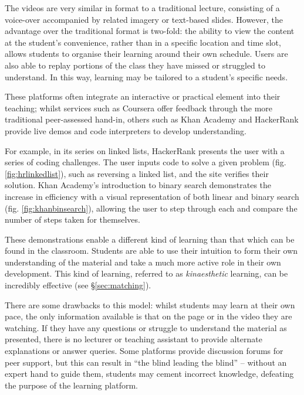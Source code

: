 \documentclass[bsc,twoside,singlespacing,parskip,logo,notimes,normalheadings]{infthesis}
\begin{document}
    The videos are very similar in format to a traditional lecture,
    consisting of a voice-over accompanied by related imagery or
    text-based slides. However, the advantage over the traditional
    format is two-fold: the ability to view the content at the
    student's convenience, rather than in a specific location and time
    slot, allows students to organise their learning around their own
    schedule. Users are also able to replay portions of the class they
    have missed or struggled to understand. In this way, learning may
    be tailored to a student's specific needs.

    These platforms often integrate an interactive or practical
    element into their teaching; whilst services such as Coursera
    offer feedback through the more traditional peer-assessed
    hand-in\cite{aboutcoursera}, others such as Khan Academy and
    HackerRank provide live demos and code interpreters to develop
    understanding.

    For example, in its series on linked lists\cite{hrlinkedlist},
    HackerRank presents the user with a series of coding
    challenges. The user inputs code to solve a given problem
    (fig. \ref{fig:hrlinkedlist}), such as reversing a linked list,
    and the site verifies their solution. Khan Academy's introduction
    to binary search\cite{khanbinsearch} demonstrates the increase in
    efficiency with a visual representation of both linear and binary
    search (fig. \ref{fig:khanbinsearch}), allowing the user to step
    through each and compare the number of steps taken for themselves.

    These demonstrations enable a different kind of learning than that
    which can be found in the classroom. Students are able to use
    their intuition to form their own understanding of the material
    and take a much more active role in their own development. This
    kind of learning, referred to as {\em kinaesthetic} learning, can
    be incredibly effective (see \S\ref{sec:matching}).

    There are some drawbacks to this model: whilst students may learn
    at their own pace, the only information available is that on the
    page or in the video they are watching. If they have any questions
    or struggle to understand the material as presented, there is no
    lecturer or teaching assistant to provide alternate explanations
    or answer queries. Some platforms provide discussion forums for
    peer support, but this can result in ``the blind leading the
    blind'' -- without an expert hand to guide them, students may
    cement incorrect knowledge, defeating the purpose of the learning
    platform.
\end{document}

